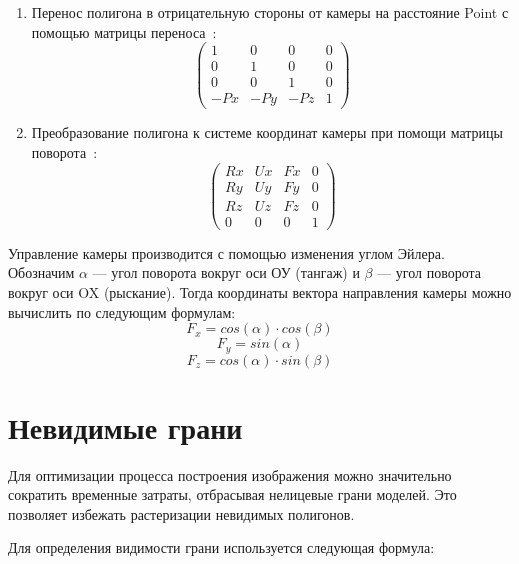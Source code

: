 \begin{enumerate}
	\item Перенос полигона в отрицательную стороны от камеры на расстояние Point с помощью матрицы переноса~\cite{palcing-camera}:
	\begin{equation}
		\begin{pmatrix}
			1  & 0  & 0  & 0 \\
			0  & 1  & 0  & 0 \\
			0  & 0  & 1  & 0 \\
			-Px & -Py & -Pz & 1
		\end{pmatrix}
	\end{equation}
	\item Преобразование полигона к системе координат камеры при помощи матрицы поворота~\cite{palcing-camera}:
	\begin{equation}
		\begin{pmatrix}
			Rx  & Ux  & Fx  & 0 \\
			Ry  & Uy  & Fy  & 0 \\
			Rz  & Uz  & Fz  & 0 \\
			0   & 0   & 0   & 1
		\end{pmatrix}
	\end{equation}
\end{enumerate}

Управление камеры производится с помощью изменения углом Эйлера.
Обозначим $\alpha$ --- угол поворота вокруг оси ОУ (тангаж) и  $\beta$ --- угол поворота вокруг оси OX (рыскание).
Тогда координаты вектора направления камеры можно вычислить по следующим формулам:
\begin{equation}
	F_x = cos(\alpha) \cdot cos(\beta)
\end{equation}
\begin{equation}
	F_y = sin(\alpha)
\end{equation}
\begin{equation}
	F_z = cos(\alpha) \cdot sin(\beta)
\end{equation}

\section{Невидимые грани}

Для оптимизации процесса построения изображения можно значительно сократить временные затраты, отбрасывая нелицевые грани моделей. Это позволяет избежать растеризации невидимых полигонов.  

Для определения видимости грани используется следующая формула:

